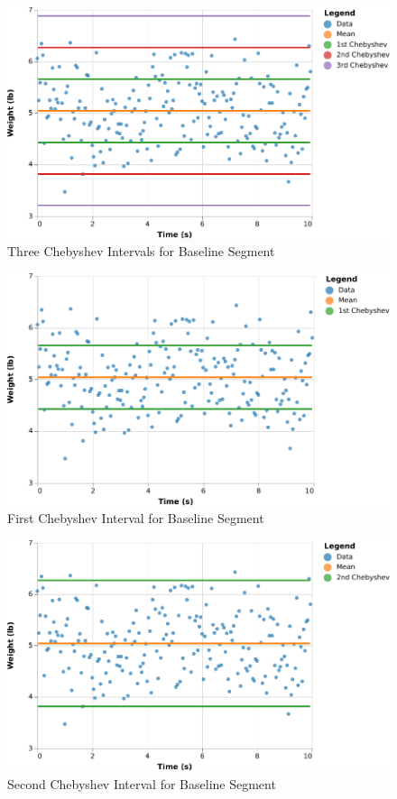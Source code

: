 \begin{figure}
    \centering
    \includegraphics{chart/00-intro/baseline-chebyshev.pdf}
    \caption{Three Chebyshev Intervals for Baseline Segment}
    \label{figure:00.baseline.chebyshev}
\end{figure}
\begin{figure}
    \centering
    \includegraphics{chart/00-intro/baseline-chebyshev-1.pdf}
    \caption{First Chebyshev Interval for Baseline Segment}
    \label{figure:00.baseline.chebyshev.1}
\end{figure}
\begin{figure}
    \centering
    \includegraphics{chart/00-intro/baseline-chebyshev-2.pdf}
    \caption{Second Chebyshev Interval for Baseline Segment}
    \label{figure:00.baseline.chebyshev.2}
\end{figure}
